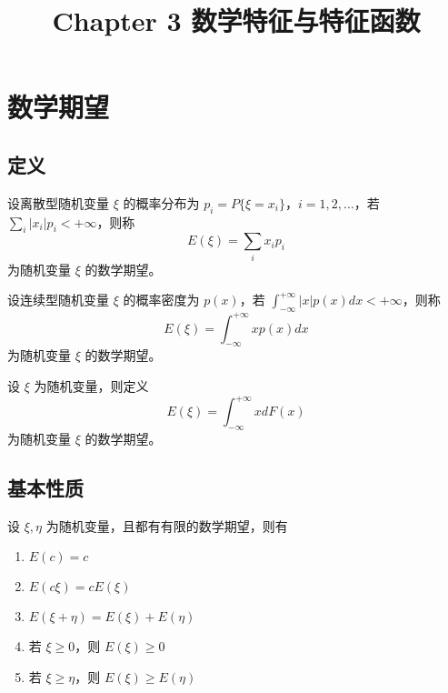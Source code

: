 \documentclass[12pt,a4paper]{amsart}
\title{Chapter 3 数学特征与特征函数}
\begin{document}
\maketitle\cite{杨振明2007}

\section{数学期望}

\subsection{定义}

\begin{definition}[离散型随机变量的数学期望]
    设离散型随机变量 $\xi$ 的概率分布为 $p_i = P\{\xi = x_i\}$，$i = 1, 2, \ldots$，若 $\sum_{i} |x_i|p_i < +\infty$，则称
    \begin{equation}
        E(\xi) = \sum_{i} x_i p_i
    \end{equation}
    为随机变量 $\xi$ 的数学期望。
\end{definition}

\begin{definition}[连续型随机变量的数学期望]
    设连续型随机变量 $\xi$ 的概率密度为 $p(x)$，若 $\int_{-\infty}^{+\infty} |x|p(x) dx < +\infty$，则称
    \begin{equation}
        E(\xi) = \int_{-\infty}^{+\infty} x p(x) dx
    \end{equation}
    为随机变量 $\xi$ 的数学期望。
\end{definition}

\begin{definition}[数学期望的统一写法]
    设 $\xi$ 为随机变量，则定义
    \begin{equation}
        E(\xi) = \int_{-\infty}^{+\infty} x dF(x)
    \end{equation}
    为随机变量 $\xi$ 的数学期望。
\end{definition}

\subsection{基本性质}

\begin{proposition}[数学期望的性质]
    设 $\xi, \eta$ 为随机变量，且都有有限的数学期望，则有
    \begin{enumerate}
        \item $E(c) = c$
        \item $E(c\xi) = cE(\xi)$
        \item $E(\xi + \eta) = E(\xi) + E(\eta)$
        \item 若 $\xi \geq 0$，则 $E(\xi) \geq 0$
        \item 若 $\xi \geq \eta$，则 $E(\xi) \geq E(\eta)$
    \end{enumerate}
\end{proposition}
\end{document}
